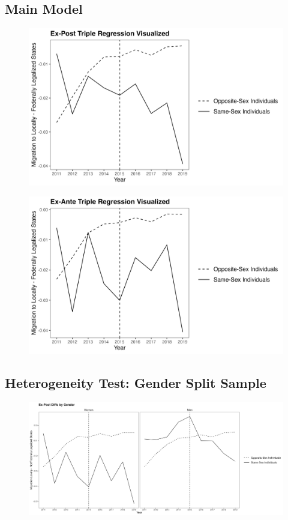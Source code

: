 \documentclass[12pt,letterpaper]{article}
\begin{document}
\subsection{Main Model}
\clearpage
\begin{figure}
    \centering
    \includegraphics[width=0.75\linewidth]{outputs/summary_stats/post_diffs.png}
    \label{fig:enter-label}
\end{figure}



\begin{figure}
    \centering
    \includegraphics[width=0.75\linewidth]{outputs/summary_stats/ante_diffs.png}
    \label{fig:enter-label}
\end{figure}




\subsection{Heterogeneity Test: Gender Split Sample}
\clearpage

\begin{figure}
    \centering
    \includegraphics[width=1\linewidth]{outputs/summary_stats/sex_post_diffs.png}
    \label{fig:enter-label}
\end{figure}
\end{document}
